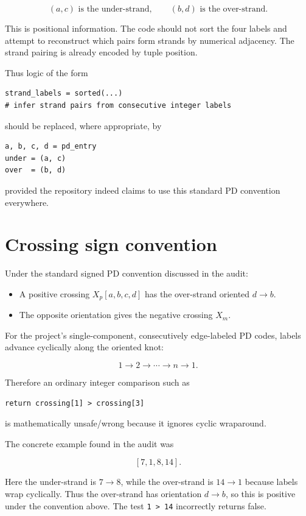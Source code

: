 \documentclass[11pt]{article}
\begin{document}
\[
\boxed{(a,c)\text{ is the under-strand}},
\qquad
\boxed{(b,d)\text{ is the over-strand}}.
\]

This is positional information. The code should not sort the four labels and attempt to reconstruct which pairs form strands by numerical adjacency. The strand pairing is already encoded by tuple position.

Thus logic of the form

\begin{verbatim}
strand_labels = sorted(...)
# infer strand pairs from consecutive integer labels
\end{verbatim}

should be replaced, where appropriate, by

\begin{verbatim}
a, b, c, d = pd_entry
under = (a, c)
over  = (b, d)
\end{verbatim}

provided the repository indeed claims to use this standard PD convention everywhere.

\section{Crossing sign convention}

Under the standard signed PD convention discussed in the audit:

\begin{itemize}
    \item A positive crossing \(X_p[a,b,c,d]\) has the over-strand oriented \(d\to b\).
    \item The opposite orientation gives the negative crossing \(X_m\).
\end{itemize}

For the project's single-component, consecutively edge-labeled PD codes, labels advance cyclically along the oriented knot:

\[
1\to2\to\cdots\to n\to1.
\]

Therefore an ordinary integer comparison such as

\begin{verbatim}
return crossing[1] > crossing[3]
\end{verbatim}

is mathematically unsafe/wrong because it ignores cyclic wraparound.

The concrete example found in the audit was

\[
[7,1,8,14].
\]

Here the under-strand is \(7\to8\), while the over-strand is \(14\to1\) because labels wrap cyclically. Thus the over-strand has orientation \(d\to b\), so this is positive under the convention above. The test \texttt{1 > 14} incorrectly returns false.
\end{document}
